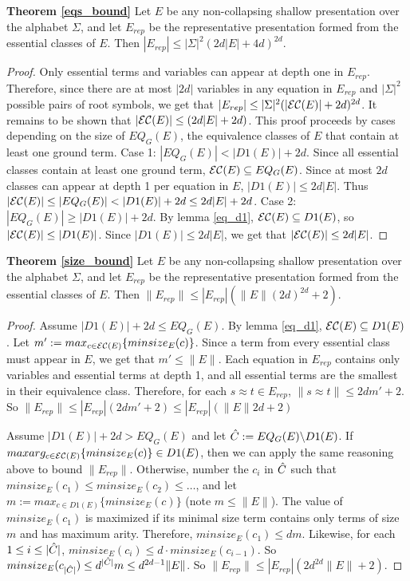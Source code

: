 \noindent \textbf{Theorem \ref{eqs_bound}} 
Let $E$ be any non-collapsing shallow presentation over the alphabet $\Sigma$, and let $E_{rep}$ be the representative presentation formed from the essential classes of $E$. 
Then $|E_{rep}| \le |\Sigma|^2(2d |E| + 4d)^{2d}$. 
\begin{proof}
Only essential terms and variables can appear at depth one in $E_{rep}$. 
Therefore, since there are at most $|2d|$ variables in any equation in $E_{rep}$ and $|\Sigma|^2$ possible pairs of root symbols, we get that $|E_{rep}| \le |\Sigma|^2(|{\mathcal{E}\mathcal{C}}(E)| + 2d)^{2d}$. %
It remains to be shown that $|{\mathcal{E}\mathcal{C}}(E)| \le (2d |E| + 2d)$.
This proof proceeds by cases depending on the size of $EQ_G(E)$, the equivalence classes of $E$ that contain at least one ground term.
Case 1:  $|EQ_G(E)| < |D1(E)| + 2d$. Since all essential classes contain at least one ground term, ${\mathcal{E}\mathcal{C}}(E) \subseteq EQ_G(E)$. Since at most $2d$ classes can appear at depth 1 per equation in $E$, $|D1(E)| \le 2d |E|$.
Thus $ |{\mathcal{E}\mathcal{C}}(E)|  \le |EQ_G(E)| < |D1(E)| + 2d \le 2d|E| +2d$.
Case 2: $|EQ_G(E)| \ge |D1(E)| + 2d$. 
By lemma \ref{eq_d1}, ${\mathcal{E}\mathcal{C}}(E) \subseteq D1(E)$, so $|{\mathcal{E}\mathcal{C}}(E)| \le |D1(E)|$.
Since $|D1(E)| \le 2d|E|$, we get that $|{\mathcal{E}\mathcal{C}}(E)| \le 2d|E|$.
\end{proof}



\noindent \textbf{Theorem \ref{size_bound}}
Let $E$ be any non-collapsing shallow presentation over the alphabet $\Sigma$, and let $E_{rep}$ be the representative presentation formed from the essential classes of $E$. 
Then $\|E_{rep}\| \le |E_{rep}|(\|E\|(2d)^{2d}+2)$. 
\begin{proof}
Assume $|D1(E)| + 2d \le EQ_G(E)$. 
By lemma \ref{eq_d1}, ${\mathcal{E}\mathcal{C}}(E) \subseteq D1(E)$. 
Let $m' := max_{c \in {\mathcal{E}\mathcal{C}}(E)} \{ minsize_E(c) \}$. 
Since a term from every essential class must appear in $E$, we get that $m' \le \|E\|$.
Each equation in $E_{rep}$ contains only variables and essential terms at depth 1, and all essential terms are the smallest in their equivalence class.
Therefore, for each $s\approx t \in E_{rep}$,  $\|s\approx t\|\le 2d m'+2$.
So $\|E_{rep}\| \le |E_{rep}|(2d m'+2)\le |E_{rep}|(\|E\|2d+2)$

Assume $|D1(E)| + 2d > EQ_G(E)$ and let $\ahat{C} := EQ_G(E) \backslash D1(E)$.
If $maxarg_{c \in {\mathcal{E}\mathcal{C}}(E)} \{ minsize_E(c) \} \in D1(E)$, then we can apply the same reasoning above to bound $\|E_{rep}\|$.
Otherwise, number the $c_i$ in $\ahat{C}$ such that $minsize_E(c_1) \le minsize_E(c_2) \le \dots$, and let $m := max_{c \in D1(E)} \{ minsize_E(c) \}$ (note $m \le \|E\|$).
The value of $minsize_E(c_1)$ is maximized if its minimal size term contains only terms of size $m$ and has maximum arity.
Therefore, $minsize_E(c_1)\le dm$.
Likewise, for each $1 \le i \le |\ahat{C}|$, $minsize_E(c_i) \le d \cdot minsize_E(c_{i-1})$.
So $minsize_E(c_{|\ahat{C}|}) \le d^{|\ahat{C}|} m \le d^{2d-1} \|E\|$.
So $\|E_{rep}\| \le |E_{rep}|(2d^{2d} \|E\| + 2)$.
\end{proof}



